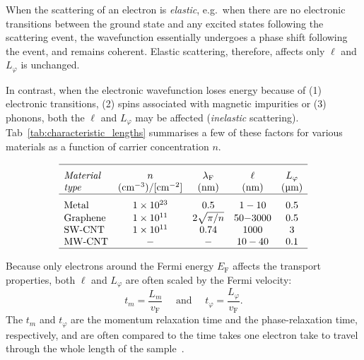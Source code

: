 When the scattering of an electron is \textit{elastic}, e.g.\ when there are no electronic transitions between the ground state and any excited states following the scattering event, the wavefunction essentially undergoes a phase shift following the event, and remains coherent. Elastic scattering, therefore, affects only $\ell$ and $L_{\varphi}$ is unchanged.

In contrast, when the electronic wavefunction loses energy because of (1) electronic transitions, (2) spins associated with magnetic impurities or (3) phonons, both the $\ell$ and $L_{\varphi}$ may be affected (\textit{inelastic} scattering). Tab~\ref{tab:characteristic_lengths} summarises a few of these factors for various materials as a function of carrier concentration $n$.
%
\begin{table}
    \caption{\label{tab:characteristic_lengths}
        Physical parameters relevant in transport phenomena. See also ~\cite{torres2014introduction, datta1997electronic}}
    \[
        \begin{array}{lcccc}
            \hline\textit{Material} & n                                     & \lambda_\textrm{F} & \ell               & L_\varphi \Tsmall                             \\
            \textit{type}           & (\textrm{cm}^{-3})/[\textrm{cm}^{-2}] & (\si{\nano\metre}) & (\si{\nano\metre}) & (\si{\micro\metre})                           \\
            \hline
            \text{Metal}            & \num{1e23}                            & 0.5                & 1-10               & 0.5                                   \Tsmall \\
            \text{Graphene}         & \num{1e11}                            & 2\sqrt{\pi/n}      & 50-$3000$          & 0.5                                           \\
            \text{SW-CNT}           & \num{1e11}                            & 0.74               & $1000$             & 3                                             \\
            \text{MW-CNT}           & -                                     & -                  & 10-40              & 0.1                                           \\
            \hline
        \end{array}
    \]
\end{table}
%
Because only electrons around the Fermi energy $E_\textrm{F}$ affects the transport properties, both  $\ell$ and $L_{\varphi}$ are often scaled by the Fermi velocity:
%
\begin{equation}
    t_{m}=\frac{L_m}{v_\textrm{F}}  \quad \text { and } \quad t_{\varphi}=\frac{L_\varphi}{v_\textrm{F}}.
\end{equation}
%
The $t_m$ and $t_\varphi$ are the momentum relaxation time and the phase-relaxation time, respectively, and are often compared to the time takes one electron take to travel through the whole length of the sample~\cite{dresselhaus1998physical}.


